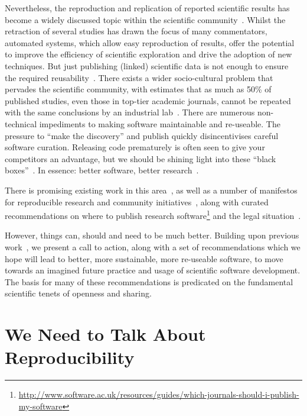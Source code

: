\documentclass[a4paper,11pt]{article}
\begin{document}
Nevertheless, the reproduction and replication of reported scientific
results has become a widely discussed topic within the scientific
community~\cite{barnes:2010,morin-et-al:2012,joppa-et-al:2013}.
Whilst the retraction of several studies has drawn the focus of many
commentators, automated systems, which allow easy reproduction of
results, offer the potential to improve the efficiency of scientific
exploration and drive the adoption of new techniques. But just
publishing (linked) scientific data is not enough to ensure the
required reusability~\cite{bechhofer-et-al:2013}. There exists a wider
socio-cultural problem that pervades the scientific community, with
estimates that as much as 50\% of published studies, even those in
top-tier academic journals, cannot be repeated with the same
conclusions by an industrial lab~\cite{osherovich:2011}. There are
numerous non-technical impediments to making software maintainable and
re-useable. The pressure to ``make the discovery'' and publish quickly
disincentivises careful software curation. Releasing code prematurely
is often seen to give your competitors an advantage, but we should be
shining light into these ``black boxes''~\cite{morin-et-al:2012}. In
essence: better software, better research~\cite{goble:2014}.

There is promising existing work in this
area~\cite{sim-et-al:2003,chirigati-et-al:2013,stodden+miguez:2014,stodden-et-al:2015},
as well as a number of manifestos for reproducible research and
community initiatives~\cite{gent:2013, fursin-et-al:2014,
  ReproResearch2010, collberg-et-al:2014, Bailey_setthe, DBLP:journals/corr/JamesWS14,
},
along with curated recommendations on where to publish research
software\footnote{\url{http://www.software.ac.uk/resources/guides/which-journals-should-i-publish-my-software}}
and the legal situation~\cite{stodden2008}.

However, things can, should and need to be much better. Building upon
previous work~\cite{crick-et-al_wssspe2}, we present a call to action,
along with a set of recommendations which we hope will lead to better,
more sustainable, more re-useable software, to move towards an
imagined future practice and usage of scientific software
development. The basis for many of these recommendations is predicated
on the fundamental scientific tenets of openness and sharing.

\section{We Need to Talk About Reproducibility}
\end{document}
